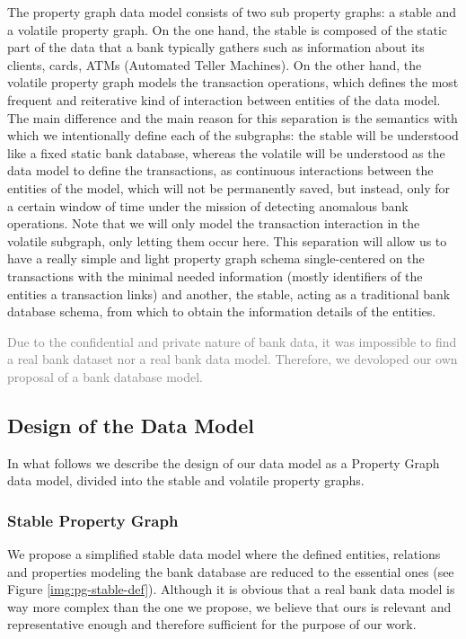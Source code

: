 \documentclass{article}
\begin{document}
The property graph data model consists of two sub property graphs: a stable and a volatile property graph. On the one hand, the stable is composed of the static part of the data that a bank typically gathers such as information about its clients, cards, ATMs (Automated Teller Machines). 
On the other hand, the volatile property graph models the transaction operations, which defines the most frequent and reiterative kind of interaction between entities of the data model.\\
The main difference and the main reason for this separation is the semantics with which we intentionally define each of the subgraphs: the stable will be understood like a fixed static bank database, whereas the volatile will be understood as the data model to define the transactions, as continuous interactions between the entities of the model, which will not be permanently saved, but instead, only for a certain window of time under the mission of detecting anomalous bank operations. Note that we will only model the transaction interaction in the volatile subgraph, only letting them occur here.
This separation will allow us to have a really simple and light property graph schema single-centered on the transactions with the minimal needed information (mostly identifiers of the entities a transaction links) and another, the stable, acting as a traditional bank database schema, from which to obtain the information details of the entities.

\textcolor{gray}{Due to the confidential and private nature of bank data, it was
impossible to find a real bank dataset nor a real bank data model. Therefore, we devoloped our own proposal of a bank database model.}

\subsection{Design of the Data Model}

In what follows we describe the design of our data model as a Property Graph data model, divided into the stable and volatile property graphs.

\subsubsection{Stable Property Graph}\label{section:stable-pg}

We propose a simplified stable data model where the defined entities, relations and properties modeling the bank database are reduced to the essential ones (see Figure \ref{img:pg-stable-def}).
Although it is obvious that a real bank data model is way more complex than the one we propose, we believe that ours is relevant and representative enough and therefore sufficient for the purpose of our work. 
\end{document}
